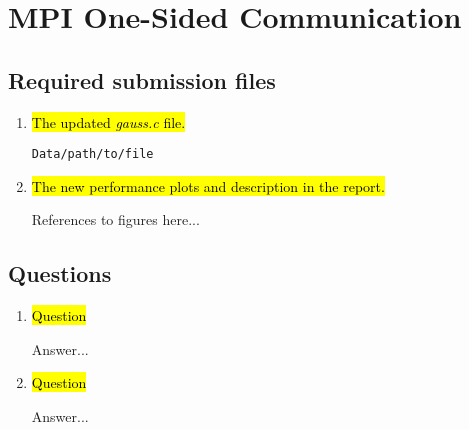 \section{MPI One-Sided Communication}
\subsection{Required submission files}
\begin{enumerate}
	\item \hl{The updated \emph{gauss.c} file.}

		\verb!Data/path/to/file!

	\item \hl{The new performance plots and description in the report.}

		References to figures here...

\end{enumerate}

\subsection{Questions}
\begin{enumerate}
	\item \hl{Question}

	Answer...

	\item \hl{Question}

	Answer...

	
\end{enumerate}
